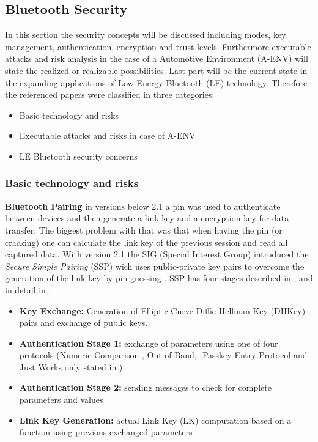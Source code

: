 \documentclass[12pt,a4paper]{article}
\begin{document}
\subsection{Bluetooth Security}
In this section the security concepts will be discussed including modes, key management, authentication, encryption and trust levels. Furthermore executable attacks and risk analysis in the case of a Automotive Environment (A-ENV) will state the realized or realizable possibilities. Last part will be the current state in the expanding applications of Low Energy Bluetooth (LE) technology. Therefore the referenced papers were classified in three categories: 
\begin{itemize}
	\item Basic technology and risks
	\item Executable attacks and risks in case of A-ENV
	\item LE Bluetooth security concerns
\end{itemize}


\subsubsection{Basic technology and risks}

\textbf{Bluetooth Pairing} in versions below 2.1 a pin was used to authenticate between devices and then generate a link key and a encryption key for data transfer. The biggest problem with that was that when having the pin (or cracking) one can calculate the link key of the previous session and read all captured data. With version 2.1 the SIG (Special Interest Group) introduced the \emph{Secure Simple Pairing} (SSP) wich uses public-private key pairs to overcome the generation of the link key by pin guessing \cite{DBLP:conf/apnoms/FanSL11}. SSP has four stages described in \cite{DBLP:conf/apnoms/FanSL11},  \cite{DBLP:journals/ijnsec/YehPWH12} and in detail in \cite{DBLP:journals/ijnsec/Lackner13} :

\begin{itemize}
	\item \textbf{Key Exchange:} Generation of Elliptic Curve Diffie-Hellman Key (DHKey) pairs and exchange of public keys.
	\item \textbf{Authentication Stage 1:} exchange of parameters using one of four protocols (Numeric Comparison-, Out of Band,- Passkey Entry Protocol and Just Works only stated in  \cite{DBLP:journals/ijnsec/Lackner13})
	\item  \textbf{Authentication Stage 2:} sending messages to check for complete parameters and values
	\item  \textbf{Link Key Generation:} actual Link Key (LK) computation based on a function using previous exchanged parameters
\end{itemize}
\end{document}
